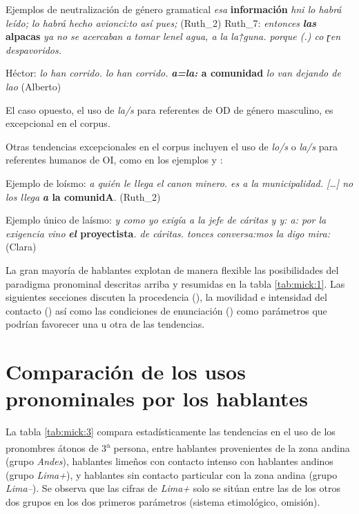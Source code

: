 \documentclass[output=paper]{../langscibook}
\begin{document}
\ea\label{ex:mick:8} {Ejemplos de neutralización de género gramatical}
\ea\label{ex:mick:8a} \textit{esa}\textbf{ \textbf{información}} \textit{{\textrangle}{\textrangle}h{\textlangle}ni lo habrá leído; lo habrá hecho avionci:to así pues;{\textlangle}} (Ruth\_2)
\ex\label{ex:mick:8b} Ruth\_7: \textit{entonces} \textbf{\textit{las} \textbf{alpacas}} \textit{ya no se acercaban a tomar {\textrangle}{\textrangle}len{\textlangle}el agua,{\textlangle} a la la↑guna. porque (.) co ɽen despavoridos.}

Héctor: \textit{lo han corrido. lo han corrido.} 
\ex\label{ex:mick:8c} \textbf{\textit{a=la:} \textbf{a} \textbf{comunidad}} \textit{lo van dejando de lao} (Alberto)
\z
\z

El caso opuesto, el uso de \textit{la/s} para referentes de OD de género masculino, es excepcional en el corpus.

Otras tendencias excepcionales en el corpus incluyen el uso de \textit{lo/s} o \textit{la/s} para referentes humanos de OI, como en los ejemplos  y :


\ea\label{ex:mick:9} {Ejemplo de loísmo: \textit{a quién le llega el canon minero. es a la} }
{\textit{municipalidad. […] no los llega} \textbf{\textit{a} \textbf{la} \textbf{comunidA}}. (Ruth\_2)}
\z

\ea\label{ex:mick:10} Ejemplo único de laísmo: \textit{y como yo exigía a la jefe de cáritas y y: a: por la exigencia vino} \textbf{\textit{el} \textbf{proyectista}}\textit{. de cáritas. tonces conversa:mos la digo mira:} (Clara)
\z

La gran mayoría de hablantes explotan de manera flexible las posibilidades del paradigma pronominal descritas arriba y resumidas en la tabla \ref{tab:mick:1}. Las siguientes secciones discuten la procedencia (), la movilidad e intensidad del contacto () así como las condiciones de enunciación () como parámetros que podrían favorecer una u otra de las tendencias.

\section{Comparación de los usos pronominales por los hablantes}\label{sec:mick:5}


La tabla \ref{tab:mick:3} compara estadísticamente las tendencias en el uso de los pronombres átonos de 3\textsuperscript{a} persona, entre hablantes provenientes de la zona andina (grupo \textit{Andes}), hablantes limeños con contacto intenso con hablantes andinos (grupo \textit{Lima+}), y hablantes sin contacto particular con la zona andina (grupo \textit{Lima–}). Se observa que las cifras de \textit{Lima+} solo se sitúan entre las de los otros dos grupos en los dos primeros parámetros (sistema etimológico, omisión).
\end{document}
